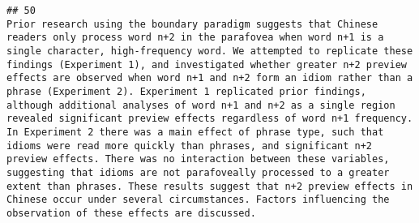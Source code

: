\documentclass[
  english,
  man]{apa6}
\begin{document}
\begin{verbatim}
## 50                                                                                                                                                                                                                                                                                                                                                                                                                                                                                                                                                                                                                                                                                                                                                                                                                                                                                                                                                                                                                                                                                                                                                                                                                                                                                                                                                                                                                                                                                                                                                                                                                                            Prior research using the boundary paradigm suggests that Chinese readers only process word n+2 in the parafovea when word n+1 is a single character, high-frequency word. We attempted to replicate these findings (Experiment 1), and investigated whether greater n+2 preview effects are observed when word n+1 and n+2 form an idiom rather than a phrase (Experiment 2). Experiment 1 replicated prior findings, although additional analyses of word n+1 and n+2 as a single region revealed significant preview effects regardless of word n+1 frequency. In Experiment 2 there was a main effect of phrase type, such that idioms were read more quickly than phrases, and significant n+2 preview effects. There was no interaction between these variables, suggesting that idioms are not parafoveally processed to a greater extent than phrases. These results suggest that n+2 preview effects in Chinese occur under several circumstances. Factors influencing the observation of these effects are discussed.

\end{verbatim}
\end{document}
